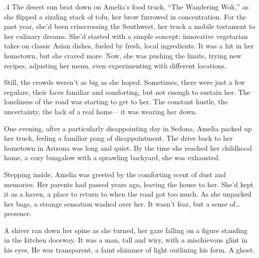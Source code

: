 \documentclass{article}
\newcommand{\baselinezs}{{\sc E2E$_{ZS}$}}
\begin{document}
\begin{tcolorbox}[colback=white, colframe=gray!30!white, coltitle=black, parskip=5mm, title=
    \textbf{System output: \baselinezs}, breakable]
    \scriptsize
    \begin{spacing}{.4}
    The desert sun beat down on Amelia’s food truck, “The Wandering Wok,” as she flipped a sizzling stack of tofu, her brow furrowed in concentration. For the past year, she’d been crisscrossing the Southwest, her truck a mobile testament to her culinary dreams. She’d started with a simple concept: innovative vegetarian takes on classic Asian dishes, fueled by fresh, local ingredients. It was a hit in her hometown, but she craved more. Now, she was pushing the limits, trying new recipes, adjusting her menu, even experimenting with different locations.  \\\par

Still, the crowds weren't as big as she hoped. Sometimes, there were just a few regulars, their faces familiar and comforting, but not enough to sustain her. The loneliness of the road was starting to get to her. The constant hustle, the uncertainty, the lack of a real home – it was wearing her down.  \\\par

One evening, after a particularly disappointing day in Sedona, Amelia packed up her truck, feeling a familiar pang of disappointment. The drive back to her hometown in Arizona was long and quiet. By the time she reached her childhood home, a cozy bungalow with a sprawling backyard, she was exhausted.  \\\par

Stepping inside, Amelia was greeted by the comforting scent of dust and memories. Her parents had passed years ago, leaving the house to her. She’d kept it as a haven, a place to return to when the road got too much. As she unpacked her bags, a strange sensation washed over her. It wasn’t fear, but a sense of…presence.  \\\par

A shiver ran down her spine as she turned, her gaze falling on a figure standing in the kitchen doorway. It was a man, tall and wiry, with a mischievous glint in his eyes. He was transparent, a faint shimmer of light outlining his form. A ghost.  \\\par


\end{spacing}
\end{tcolorbox}
\end{document}
